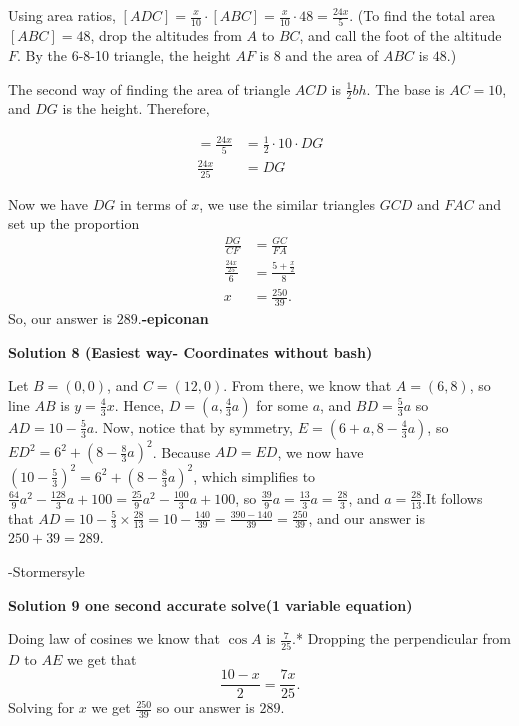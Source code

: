 \begin{enumerate}
 Using area ratios, $[ADC] = \frac{x}{10}\cdot[ABC] = \frac{x}{10} \cdot 48 = \frac{24x}{5}$. (To find the total area $[ABC] = 48$, drop the altitudes from $A$ to $BC$, and call the foot of the altitude $F$. By the 6-8-10 triangle, the height $AF$ is $8$ and the area of $ABC$ is $48$.)

 The second way of finding the area of triangle $ACD$ is $\frac{1}{2}bh$. The base is $AC=10$, and $DG$ is the height. Therefore, 

 \begin{align*}[ACD] = \frac{24x}{5} &= \frac{1}{2} \cdot 10 \cdot DG \\[5pt]\frac{24x}{25} &= DG\end{align*}
 

 Now we have $DG$ in terms of $x$, we use the similar triangles $GCD$ and $FAC$ and set up the proportion\begin{align*}\frac{DG}{CF} &= \frac{GC}{FA} \\[5pt]\frac{\frac{24x}{25}}{6} &= \frac{5+\frac{x}{2}}{8} \\[5pt]x &= \frac{250}{39}.\end{align*}
So, our answer is $\boxed{289}$.\textbf{-epiconan}

 



\textbf{Solution 8 (Easiest way- Coordinates without bash)}

Let $B=(0, 0)$, and $C=(12, 0)$. From there, we know that $A=(6, 8)$, so line $AB$ is $y=\frac{4}{3}x$. Hence, $D=(a, \frac{4}{3}a)$ for some $a$, and $BD=\frac{5}{3}a$ so $AD=10-\frac{5}{3}a$. Now, notice that by symmetry, $E=(6+a, 8-\frac{4}{3}a)$, so $ED^2=6^2+(8-\frac{8}{3}a)^2$. Because $AD=ED$, we now have $(10-\frac{5}{3})^2=6^2+(8-\frac{8}{3}a)^2$, which simplifies to $\frac{64}{9}a^2-\frac{128}{3}a+100=\frac{25}{9}a^2-\frac{100}{3}a+100$, so $\frac{39}{9}a=\frac{13}{3}a=\frac{28}{3}$, and $a=\frac{28}{13}$.It follows that $AD=10-\frac{5}{3}\times\frac{28}{13}=10-\frac{140}{39}=\frac{390-140}{39}=\frac{250}{39}$, and our answer is $250+39=\boxed{289}$.

 -Stormersyle

 



\textbf{Solution 9 one second accurate solve(1 variable equation)}

Doing law of cosines we know that $\cos A$ is $\frac{7}{25}.$* Dropping the perpendicular from $D$ to $AE$ we get that 
 \[\frac{10-x}{2}=\frac{7x}{25}.\] Solving for $x$ we get $\frac{250}{39}$ so our answer is $289$.


\end{enumerate}
